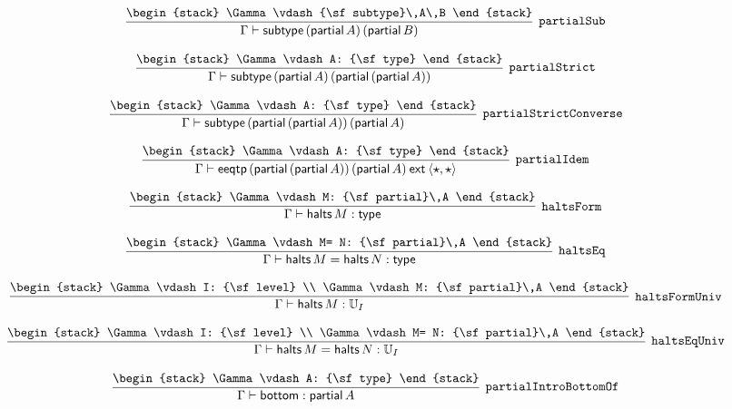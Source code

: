 \[
\infer[{\tt partialSub}]{\Gamma \vdash {\sf subtype}\,({\sf partial}\,A)\,({\sf partial}\,B)}{
\begin{stack}
\Gamma \vdash {\sf subtype}\,A\,B
\end{stack}}
\]

\[
\infer[{\tt partialStrict}]{\Gamma \vdash {\sf subtype}\,({\sf partial}\,A)\,({\sf partial}\,({\sf partial}\,A))}{
\begin{stack}
\Gamma \vdash A: {\sf type}
\end{stack}}
\]

\[
\infer[{\tt partialStrictConverse}]{\Gamma \vdash {\sf subtype}\,({\sf partial}\,({\sf partial}\,A))\,({\sf partial}\,A)}{
\begin{stack}
\Gamma \vdash A: {\sf type}
\end{stack}}
\]

\[
\infer[{\tt partialIdem}]{\Gamma \vdash {\sf eeqtp}\,({\sf partial}\,({\sf partial}\,A))\,({\sf partial}\,A)\:{\sf ext}\:\langle \star ,\star \rangle }{
\begin{stack}
\Gamma \vdash A: {\sf type}
\end{stack}}
\]

\[
\infer[{\tt haltsForm}]{\Gamma \vdash {\sf halts}\,M: {\sf type}}{
\begin{stack}
\Gamma \vdash M: {\sf partial}\,A
\end{stack}}
\]

\[
\infer[{\tt haltsEq}]{\Gamma \vdash {\sf halts}\,M= {\sf halts}\,N: {\sf type}}{
\begin{stack}
\Gamma \vdash M= N: {\sf partial}\,A
\end{stack}}
\]

\[
\infer[{\tt haltsFormUniv}]{\Gamma \vdash {\sf halts}\,M: {\Bbb U}_{I}}{
\begin{stack}
\Gamma \vdash I: {\sf level}
\\
\Gamma \vdash M: {\sf partial}\,A
\end{stack}}
\]

\[
\infer[{\tt haltsEqUniv}]{\Gamma \vdash {\sf halts}\,M= {\sf halts}\,N: {\Bbb U}_{I}}{
\begin{stack}
\Gamma \vdash I: {\sf level}
\\
\Gamma \vdash M= N: {\sf partial}\,A
\end{stack}}
\]

\[
\infer[{\tt partialIntroBottomOf}]{\Gamma \vdash {\sf bottom}: {\sf partial}\,A}{
\begin{stack}
\Gamma \vdash A: {\sf type}
\end{stack}}
\]

